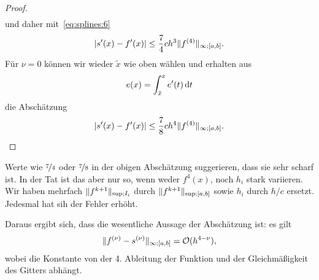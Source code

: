 \begin{proof}
\begin{gather}
  \end{gather}
  und daher mit~\eqref{eq:splines:6}
  \begin{gather}
    \lvert s'(x) - f'(x)\rvert \le \frac74 ch^3 \lVert f^{(4)}\rVert_{\infty;[a,b]}.
  \end{gather}
  Für $\nu=0$ können wir wieder $\tilde x$ wie oben wählen und erhalten aus
  \begin{gather}
    e(x) = \int_{\tilde x}^x e'(t)\,\mathrm{d} t
  \end{gather}
  die Abschätzung
  \begin{gather}
    \lvert s'(x) - f'(x)\rvert \le \frac78 ch^4 \lVert f^{(4)}\rVert_{\infty;[a,b]}.
  \end{gather}  
\end{proof}

\begin{remark}
  Werte wie $\nicefrac74$ oder $\nicefrac78$ in der obigen
  Abschätzung suggerieren, dass sie sehr scharf ist. In der Tat ist
  das aber nur so, wenn weder $f^{4}(x)$, noch $h_i$ stark
  variieren. Wir haben mehrfach $\lVert f^{k+1}\rVert_{\sup;I_i}$ durch
  $\lVert f^{k+1}\rVert_{\sup;[a,b]}$ sowie $h_i$ durch $h/c$
  ersetzt. Jedesmal hat sih der Fehler erhöht.

  Daraus ergibt sich, dass die wesentliche Aussage der Abschätzung ist: es gilt
  \begin{gather}
    \lVert f^{(\nu)}-s^{(\nu)}\rVert_{\infty;[a,b]}
    = \mathcal O(h^{4-\nu}),
  \end{gather}
  wobei die Konstante von der 4. Ableitung der Funktion und
  der Gleichmäßigkeit des Gitters abhängt.
\end{remark}

